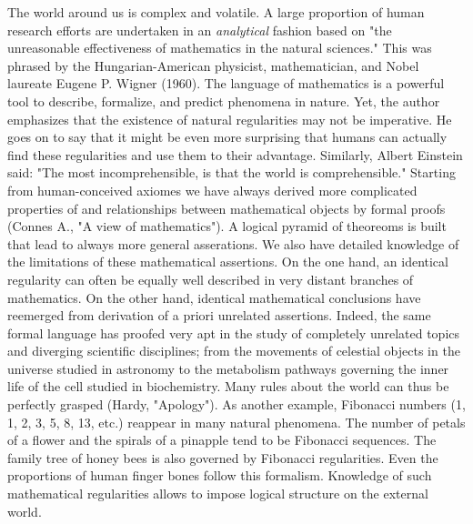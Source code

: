 \documentclass[authoryear,review,3p]{elsarticle}
\begin{document}
The world around us is complex and volatile.
%
A large proportion of human research efforts are undertaken
in an \textit{analytical} fashion
based on 
"the unreasonable effectiveness of mathematics in the natural sciences."
This was phrased by the Hungarian-American
physicist, mathematician, and Nobel laureate Eugene P. Wigner (1960).
The language of mathematics is a powerful tool to
describe, formalize, and predict phenomena in nature.
Yet, the author emphasizes that the existence of natural regularities may not be imperative. He goes on to
say that it might be even more surprising that humans can actually
find these regularities and use them to their advantage.
Similarly, Albert Einstein said:
"The most incomprehensible, is that the world is comprehensible." 
%
Starting from human-conceived axiomes
we have always derived more complicated
properties of and relationships between mathematical objects by formal proofs
(Connes A., "A view of mathematics").
A logical pyramid of theoreoms is built that lead to always
more general asserations.
We also have detailed knowledge of the limitations of these mathematical
assertions.
%
On the one hand,
an identical regularity can often be equally well described in very distant
branches of mathematics.
On the other hand,
identical mathematical conclusions have reemerged from derivation of
a priori unrelated assertions.
%
Indeed, the same formal language has proofed very apt in
the study of completely unrelated topics and diverging scientific disciplines;
from the movements of celestial objects in the universe
studied in astronomy
to
the metabolism pathways governing the inner life of the cell
studied in biochemistry.
%
Many rules about the world can thus be perfectly grasped
(Hardy, "Apology").
As another example,
Fibonacci numbers (1, 1, 2, 3, 5, 8, 13, etc.)
reappear in many natural phenomena.
The number of petals of a flower and the spirals of a pinapple tend
to be Fibonacci sequences.
The family tree of honey bees is also governed by Fibonacci regularities.
Even the proportions of human finger bones follow this formalism.
Knowledge of such mathematical regularities
allows to impose logical structure on the external world.
\end{document}
